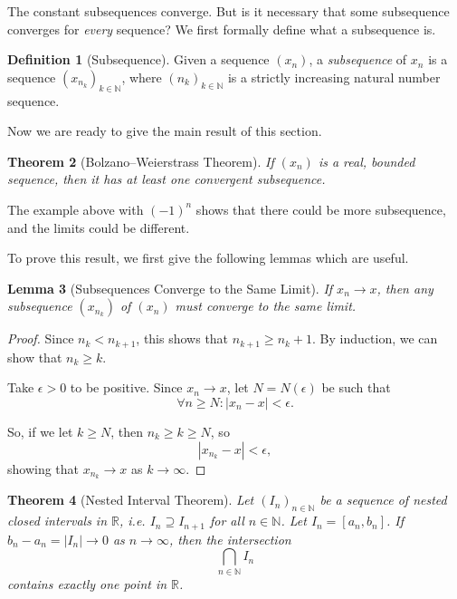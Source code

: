 \documentclass[11pt]{article}
\numberwithin{equation}{section}
\newtheorem{theorem}{Theorem}[section]
\newtheorem{lemma}[theorem]{Lemma}
\theoremstyle{definition}
\newtheorem{definition}[theorem]{Definition}
\theoremstyle{remark}
\newcommand{\pqty}[1]{\left(#1\right)}
\newcommand{\abs}[1]{\left|#1\right|}
\newcommand{\ccintv}[2]{[#1,#2]}
\newcommand{\RR}{\mathbb R}
\newcommand{\NN}{\mathbb N}
\begin{document}
The constant subsequences converge. But is it necessary that some subsequence converges for \emph{every} sequence? We first formally define what a subsequence is.

\begin{definition}[Subsequence]\label{analysis-unit-0016}
    \label{def:seq-subsequence}%
    Given a sequence \(\pqty{x_n}\), a \emph{subsequence} of \(x_n\) is a sequence \(\pqty{x_{n_k}}_{k \in \NN}\), where \(\pqty{n_k}_{k \in \NN}\) is a strictly increasing natural number sequence.
\end{definition}

Now we are ready to give the main result of this section.

\begin{theorem}[Bolzano--Weierstrass Theorem]\label{analysis-unit-0017}
    \label{thm:bolzano-weierstrass}%
    If \(\pqty{x_n}\) is a real, bounded sequence, then it has at least one convergent subsequence.
\end{theorem}

The example above with \(\pqty{-1}^n\) shows that there could be more subsequence, and the limits could be different.

To prove this result, we first give the following lemmas which are useful.

\begin{lemma}[Subsequences Converge to the Same Limit]\label{analysis-unit-0018}
    \label{lem:seq-subsequence-same-limit}%
    If \(x_n \to x\), then any subsequence \(\pqty{x_{n_k}}\) of \(\pqty{x_n}\) must converge to the same limit.
\end{lemma}

\begin{proof}
    Since \(n_k < n_{k + 1}\), this shows that \(n_{k + 1} \geq n_k + 1\). By induction, we can show that \(n_k \geq k\).

    Take \(\epsilon > 0\) to be positive. Since \(x_n \to x\), let \(N = N\pqty{\epsilon}\) be such that
    \[
        \forall n \geq N: \abs{x_n - x} < \epsilon.
    \]

    So, if we let \(k \geq N\), then \(n_k \geq k \geq N\), so
    \[
        \abs{x_{n_k} - x} < \epsilon,
    \]
    showing that \(x_{n_k} \to x\) as \(k \to \infty\).
\end{proof}

\begin{theorem}[Nested Interval Theorem]\label{analysis-unit-0019}
    \label{thm:nested-interval-thm}%
    Let \(\pqty{I_n}_{n \in \NN}\) be a sequence of nested closed intervals in \(\RR\), i.e. \(I_n \supseteq I_{n + 1}\) for all \(n \in \NN\). Let \(I_n = \ccintv{a_n}{b_n}\). If \(b_n - a_n = \abs{I_n} \to 0\) as \(n \to \infty\), then the intersection
    \[
        \bigcap_{n \in \NN} I_n
    \]
    contains exactly one point in \(\RR\).
\end{theorem}
\end{document}

